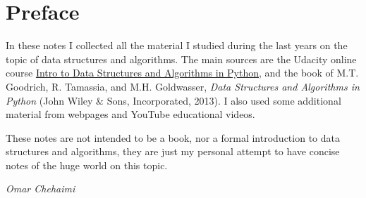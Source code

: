 
\chapter*{Preface}

In these notes I collected all the material I studied during the last years on the topic of data structures and algorithms. The main sources are the Udacity online course \href{https://www.udacity.com/course/data-structures-and-algorithms-in-python--ud513}{Intro to Data Structures and Algorithms in Python}, and the book of M.T. Goodrich, R. Tamassia, and M.H. Goldwasser, \textit{Data Structures and Algorithms in Python} (John Wiley \& Sons, Incorporated, 2013). I also used some additional material from webpages and YouTube educational videos.

These notes are not intended to be a book, nor a formal introduction to data structures and algorithms, they are just my personal attempt to have concise notes of the huge world on this topic.

 
\begin{flushright}
	\textit{Omar Chehaimi}
\end{flushright}

\hfill

\vfill

\noindent
\textsf{}

\noindent
{}\,